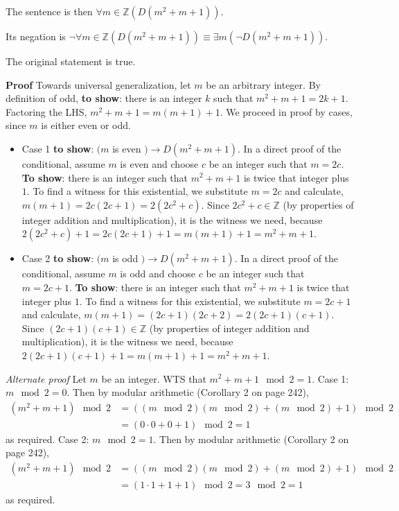 \begin{description}
\begin{enumerate}
{  
  The sentence is then $\forall m \in \mathbb{Z} ( D(m^2 + m + 1))$.
  
  Its negation is $\neg \forall m \in \mathbb{Z} ( D(m^2 + m + 1)) \equiv \exists m ( \neg D(m^2 + m + 1))$.
  
  The original statement is true.
  
  {\bf  Proof} Towards universal generalization, let $m$ be an arbitrary integer.  
  By   definition of odd, {\bf to show}: 
  there is an integer $k$ such 
  that $m^2 + m + 1 = 2k + 1$. Factoring the LHS, $m^2 + m + 1 = m(m+1) + 1$.  
  We proceed  in proof by cases, since $m$ is either even or odd.
  \begin{itemize}
  \item Case 1  {\bf to  show}: $(m$ is even $) \to  D(m^2+m+1)$.  In a direct proof of the conditional, 
   assume $m$ is even and choose $c$ be an integer such that $m = 2c$. 
   {\bf To show}: there is an integer such that $m^2+m+1$  is twice  that integer plus $1$.
  To find a witness  for this existential, we substitute  $m=2c$ and calculate, $m(m+1) = 2c(2c+1) = 2( 2c^2 + c) $.
  Since $2c^2 +c \in \mathbb{Z}$ (by properties of integer addition and multiplication), 
  it is the witness we need, because $2(2c^2+c) +1 =  2c(2c+1) +1 = m(m+1)+1 =  m^2+m+1$.
  \item Case 2 {\bf  to  show}: $(m$ is odd $) \to  D(m^2+m+1)$.  In a direct proof of the conditional, 
   assume $m$ is odd and choose $c$ be an integer such that $m = 2c+1$. 
   {\bf To show}: there is an integer such that $m^2+m+1$  is twice  that integer plus $1$.
  To find a witness  for this existential, we substitute  $m=2c+1$ and calculate, $m(m+1) = (2c+1)(2c+2) = 2( 2c+1)(c+1) $.
  Since $(2c+1)(c+1)\in \mathbb{Z}$ (by properties of integer addition and multiplication), 
  it is the witness we need, because $2(2c+1)(c+1)  + 1=  m(m+1) + 1=  m^2+m+1$.
  \end{itemize}
  
  {\it Alternate proof} Let $m$ be an integer.  WTS that $m^2+m+1 \mod 2 = 1$. 
  Case 1: $m \mod 2 = 0$.  Then by modular arithmetic (Corollary 2 on page 242), 
  \begin{align*}
  (m^2 + m + 1) \mod 2 &= \left( (m \mod 2 ) (m \mod 2) + (m \mod 2) + 1 \right) \mod 2 \\
  & = (0 \cdot 0 + 0 +1 ) \mod 2 = 1
  \end{align*}
  as required.  Case 2: $m \mod 2 = 1$.  Then 
  by modular arithmetic (Corollary 2 on page 242), 
  \begin{align*}
  (m^2 + m + 1) \mod 2 &= \left( (m \mod 2 ) (m \mod 2) + (m \mod 2) + 1 \right) \mod 2 \\
  & = (1 \cdot 1 + 1 +1 ) \mod 2 = 3 \mod 2 = 1
  \end{align*}
  as required.
  }
  \else{}
  \fi
  

\end{enumerate}
\end{description}
